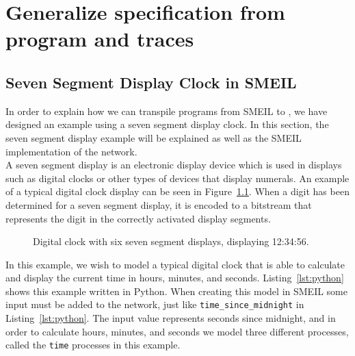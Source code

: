 \chapter{Generalize specification from program and traces}
\section{Seven Segment Display Clock in SMEIL}\label{sec:example-smeil}
In order to explain how we can transpile programs from SMEIL to \cspm{}, we have designed an example using a seven segment display clock.
In this section, the seven segment display example will be explained as well as the SMEIL implementation of the network.
\\

A seven segment display is an electronic display device which is used in displays such as digital clocks or other types of devices that display numerals. An example of a typical digital clock display can be seen in Figure~\ref{fig:6_displays}. When a digit has been determined for a seven segment display, it is encoded to a bitstream that represents the digit in the correctly activated display segments.
\begin{figure}[!ht]
  \begin{center}
  \end{center}
  \caption{Digital clock with six seven segment displays, displaying 12:34:56.}
  \label{fig:6_displays}
\end{figure}
In this example, we wish to model a typical digital clock that is able to calculate and display the current time in hours, minutes, and seconds. Listing~\ref{lst:python} shows this example written in Python.
When creating this model in SMEIL some input must be added to the network, just like \texttt{time\_since\_midnight} in Listing~\ref{lst:python}. The input value represents seconds since midnight, and in order to calculate hours, minutes, and seconds we model three different processes, called the \texttt{time} processes in this example.

